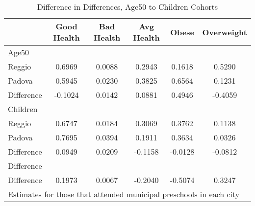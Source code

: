 \begin{table}[htbp]\centering
\caption{Difference in Differences, Age50 to Children Cohorts}
\begin{tabular}{l*{5}{c}}
\hline\hline
            & Good Health&  Bad Health&  Avg Health&       Obese&  Overweight\\
\hline
Age50       &            &            &            &            &            \\
Reggio      &      0.6969&      0.0088&      0.2943&      0.1618&      0.5290\\
Padova      &      0.5945&      0.0230&      0.3825&      0.6564&      0.1231\\
Difference  &     -0.1024&      0.0142&      0.0881&      0.4946&     -0.4059\\
\hline
Children    &            &            &            &            &            \\
Reggio      &      0.6747&      0.0184&      0.3069&      0.3762&      0.1138\\
Padova      &      0.7695&      0.0394&      0.1911&      0.3634&      0.0326\\
Difference  &      0.0949&      0.0209&     -0.1158&     -0.0128&     -0.0812\\
\hline
Difference  &            &            &            &            &            \\
Difference  &      0.1973&      0.0067&     -0.2040&     -0.5074&      0.3247\\
\hline\hline
\multicolumn{6}{l}{\footnotesize Estimates for those that attended municipal preschools in each city}\\
\end{tabular}
\end{table}
